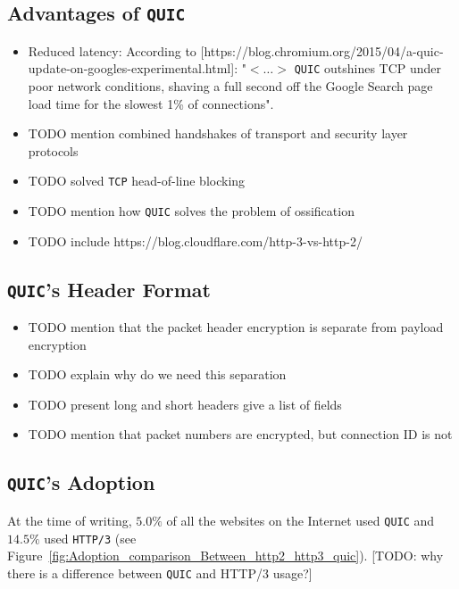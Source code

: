 \documentclass[12pt,a4paper,twoside,openright]{report}
\begin{document}
\subsection{Advantages of \texttt{QUIC}} \label{QUIC_advantages}

\begin{itemize}
  \item Reduced latency:
  According to [https://blog.chromium.org/2015/04/a-quic-update-on-googles-experimental.html]: "$<\ldots>$ \texttt{QUIC} outshines TCP under poor network conditions, shaving a full second off the Google Search page load time for the slowest 1\% of connections".
  \item TODO mention combined handshakes of transport and security layer protocols 

  \item TODO solved \texttt{TCP} head-of-line blocking

  
  \item TODO mention how \texttt{QUIC} solves the problem of ossification
  
  \item TODO include https://blog.cloudflare.com/http-3-vs-http-2/
\end{itemize}




\subsection{\texttt{QUIC}'s Header Format} \label{subsection_QUIC_header_format}

\begin{itemize}
  \item TODO mention that the packet header encryption is separate from payload encryption
  \item TODO explain why do we need this separation
  \item TODO present long and short headers give a list of fields
  \item TODO mention that packet numbers are encrypted, but connection ID is not
\end{itemize}

\subsection{\texttt{QUIC}'s Adoption}

At the time of writing, $5.0\%$ of all the websites on the Internet used \texttt{QUIC} and $14.5\%$ used \texttt{HTTP/3} \cite{bib_Adoption_comparison_Between_http2_http3_quic}
(see Figure~\ref{fig:Adoption_comparison_Between_http2_http3_quic}).
[TODO: why there is a difference between \texttt{QUIC} and HTTP/3 usage?]
\end{document}
